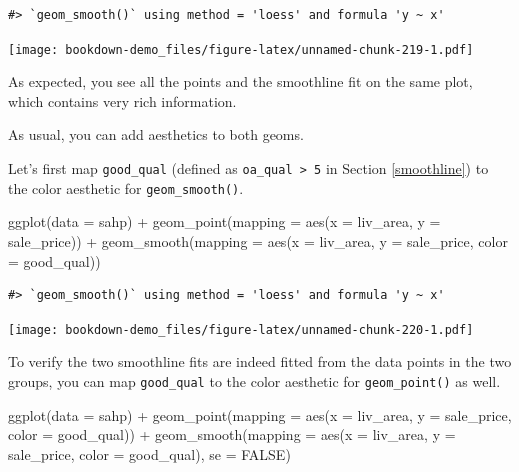 \documentclass[
]{book}
\newenvironment{Shaded}{\begin{snugshade}}{\end{snugshade}}
\newcommand{\AttributeTok}[1]{\textcolor[rgb]{0.77,0.63,0.00}{#1}}
\newcommand{\ConstantTok}[1]{\textcolor[rgb]{0.00,0.00,0.00}{#1}}
\newcommand{\FunctionTok}[1]{\textcolor[rgb]{0.00,0.00,0.00}{#1}}
\newcommand{\NormalTok}[1]{#1}
\newcommand{\SpecialCharTok}[1]{\textcolor[rgb]{0.00,0.00,0.00}{#1}}
\begin{document}
\begin{verbatim}
#> `geom_smooth()` using method = 'loess' and formula 'y ~ x'
\end{verbatim}

\texttt{[image: bookdown-demo\_files/figure-latex/unnamed-chunk-219-1.pdf]}

As expected, you see all the points and the smoothline fit on the same plot, which contains very rich information.

As usual, you can add aesthetics to both geoms.

Let's first map \texttt{good\_qual} (defined as \texttt{oa\_qual\ \textgreater{}\ 5} in Section \ref{smoothline}) to the color aesthetic for \texttt{geom\_smooth()}.

\begin{Shaded}
\begin{Highlighting}[]
\FunctionTok{ggplot}\NormalTok{(}\AttributeTok{data =}\NormalTok{ sahp) }\SpecialCharTok{+} \FunctionTok{geom\_point}\NormalTok{(}\AttributeTok{mapping =} \FunctionTok{aes}\NormalTok{(}\AttributeTok{x =}\NormalTok{ liv\_area, }\AttributeTok{y =}\NormalTok{ sale\_price)) }\SpecialCharTok{+} \FunctionTok{geom\_smooth}\NormalTok{(}\AttributeTok{mapping =} \FunctionTok{aes}\NormalTok{(}\AttributeTok{x =}\NormalTok{ liv\_area, }\AttributeTok{y =}\NormalTok{ sale\_price, }\AttributeTok{color =}\NormalTok{ good\_qual))}
\end{Highlighting}
\end{Shaded}

\begin{verbatim}
#> `geom_smooth()` using method = 'loess' and formula 'y ~ x'
\end{verbatim}

\texttt{[image: bookdown-demo\_files/figure-latex/unnamed-chunk-220-1.pdf]}

To verify the two smoothline fits are indeed fitted from the data points in the two groups, you can map \texttt{good\_qual} to the color aesthetic for \texttt{geom\_point()} as well.

\begin{Shaded}
\begin{Highlighting}[]
\FunctionTok{ggplot}\NormalTok{(}\AttributeTok{data =}\NormalTok{ sahp) }\SpecialCharTok{+} \FunctionTok{geom\_point}\NormalTok{(}\AttributeTok{mapping =} \FunctionTok{aes}\NormalTok{(}\AttributeTok{x =}\NormalTok{ liv\_area, }\AttributeTok{y =}\NormalTok{ sale\_price, }\AttributeTok{color =}\NormalTok{ good\_qual)) }\SpecialCharTok{+} \FunctionTok{geom\_smooth}\NormalTok{(}\AttributeTok{mapping =} \FunctionTok{aes}\NormalTok{(}\AttributeTok{x =}\NormalTok{ liv\_area, }\AttributeTok{y =}\NormalTok{ sale\_price, }\AttributeTok{color =}\NormalTok{ good\_qual), }\AttributeTok{se =} \ConstantTok{FALSE}\NormalTok{)}
\end{Highlighting}
\end{Shaded}
\end{document}
